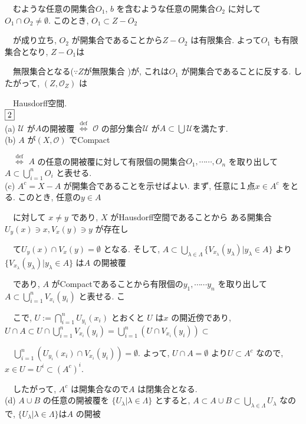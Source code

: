 \documentclass{jsarticle}
\begin{document}
\ \ むような任意の開集合$O_1$, $b$ を含むような任意の開集合$O_2$ に対して$O_1 \cap O_2 \neq \emptyset$. このとき, $O_1 \subset Z - O_2$

\ \ が成り立ち, $O_2$ が開集合であることから$Z - O_2$ は有限集合. よって$O_1$ も有限集合となり, $Z - O_1$は

\ \ 無限集合となる($\because Z が無限集合$ )が, これは$O_1$ が開集合であることに反する. したがって, $(Z,\mathcal{O}_Z)$ は

\ \ Hausdorff空間. \\
$\fbox{2}$ \\
(a) $\mathcal{U}$ が$A$の開被覆 $\stackrel{\mathrm{def}}{\Longleftrightarrow}$
$\mathcal{O}$ の部分集合$\mathcal{U}$ が$A \subset \bigcup \mathcal{U}$を満たす. \\
(b) $A$ が$(X, \mathcal{O})$ でCompact 

\ \ $\stackrel{\mathrm{def}}{\Longleftrightarrow}$
$A$ の任意の開被覆に対して有限個の開集合$O_1, \dotsb\dotsb, O_n$ を取り出して$A \subset \displaystyle \bigcup_{i=1}^n O_i$ と表せる. \\
(c) $A^c = X - A$ が開集合であることを示せばよい. まず, 任意に１点$x \in A^c$ をとる. このとき, 任意の$y \in A$

\ \ に対して $x \neq y$ であり, $X$ がHausdorff空間であることから ある開集合$U_y(x) \ni x, V_x(y) \ni y$ が存在し

\ \ て$U_y(x) \cap V_x(y) = \emptyset$ となる. そして, $A \subset \displaystyle \bigcup_{\lambda \in \Lambda} \{V_{x_\lambda}(y_\lambda) | y_\lambda \in A\}$ より $\{V_{x_\lambda}(y_\lambda) | y_\lambda \in A\}$ は$A$ の開被覆

\ \ であり, $A$ がCompactであることから有限個の$y_1, \dotsb\dotsb y_n$ を取り出して $A \subset \displaystyle \bigcup_{i=1}^n V_{x_i}(y_i)$ と表せる. こ

\ \ こで, $U := \displaystyle \bigcap_{i=1}^n U_{y_i}(x_i)$ とおくと $U$ は$x$ の開近傍であり, $U \cap A \subset U \cap \displaystyle \bigcup_{i=1}^n V_{x_i}(y_i) = \displaystyle \bigcup_{i=1}^n (U \cap V_{x_i}(y_i)) \subset$

\ \ $\displaystyle \bigcup_{i=1}^n (U_{y_i}(x_i) \cap V_{x_i}(y_i)) = \emptyset$. よって, $U \cap A = \emptyset$ より$U \subset A^c$ なので, $x \in U = U^i \subset (A^c)^i$. 

\ \ したがって, $A^c$ は開集合なので$A$ は閉集合となる. \\
(d) $A \cup B$ の任意の開被覆を $\{U_\lambda|\lambda \in \Lambda \}$ とすると, $A \subset A \cup B \subset \displaystyle \bigcup_{\lambda \in \Lambda} U_\lambda$ なので, $\{U_\lambda|\lambda \in \Lambda\}$は$A$ の開被
\end{document}
